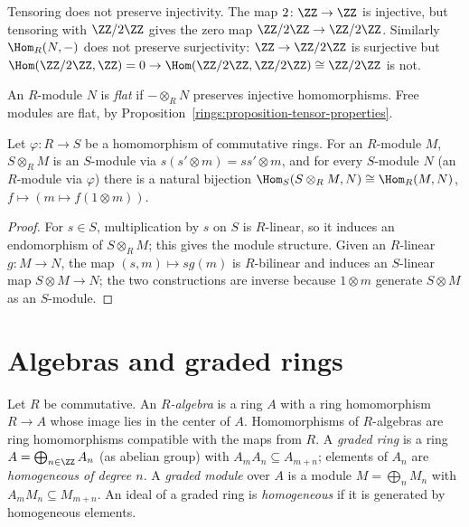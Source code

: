\begin{counterexample}\label{rings:counterexample-tensor-not-left-exact}
Tensoring does not preserve injectivity. The map $2 \colon \ZZ \to \ZZ$ is injective, but
tensoring with $\ZZ/2\ZZ$ gives the zero map $\ZZ/2\ZZ \to \ZZ/2\ZZ$. Similarly
$\Hom_R(N, -)$ does not preserve surjectivity: $\ZZ \to \ZZ/2\ZZ$ is surjective but
$\Hom(\ZZ/2\ZZ, \ZZ) = 0 \to \Hom(\ZZ/2\ZZ, \ZZ/2\ZZ) \cong \ZZ/2\ZZ$ is not.
\end{counterexample}

\begin{definition}\label{rings:definition-flat}
An $R$-module $N$ is \emph{flat} if $- \otimes_R N$ preserves injective homomorphisms.
Free modules are flat, by Proposition~\ref{rings:proposition-tensor-properties}.
\end{definition}

\begin{proposition}\label{rings:proposition-extension-scalars}
Let $\varphi \colon R \to S$ be a homomorphism of commutative rings. For an $R$-module $M$,
$S \otimes_R M$ is an $S$-module via $s(s' \otimes m) = ss' \otimes m$, and for every $S$-module $N$
(an $R$-module via $\varphi$) there is a natural bijection
$\Hom_S(S \otimes_R M, N) \cong \Hom_R(M, N)$, $f \mapsto (m \mapsto f(1 \otimes m))$.
\end{proposition}

\begin{proof}
For $s \in S$, multiplication by $s$ on $S$ is $R$-linear, so it induces an endomorphism of
$S \otimes_R M$; this gives the module structure. Given an $R$-linear $g \colon M \to N$, the map
$(s, m) \mapsto sg(m)$ is $R$-bilinear and induces an $S$-linear map $S \otimes M \to N$; the two
constructions are inverse because $1 \otimes m$ generate $S \otimes M$ as an $S$-module.
\end{proof}

\section{Algebras and graded rings}\label{rings:section-algebras}

\begin{definition}\label{rings:definition-algebra}
Let $R$ be commutative. An \emph{$R$-algebra} is a ring $A$ with a ring homomorphism
$R \to A$ whose image lies in the center of $A$. Homomorphisms of $R$-algebras are ring
homomorphisms compatible with the maps from $R$. A \emph{graded ring} is a ring
$A = \bigoplus_{n \in \ZZ} A_n$ (as abelian group) with $A_m A_n \subseteq A_{m+n}$; elements of $A_n$ are
\emph{homogeneous of degree $n$}. A \emph{graded module} over $A$ is a module
$M = \bigoplus_n M_n$ with $A_m M_n \subseteq M_{m+n}$. An ideal of a graded ring is \emph{homogeneous} if
it is generated by homogeneous elements.
\end{definition}

